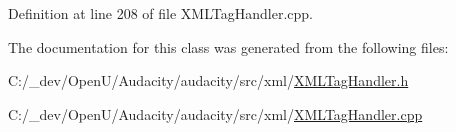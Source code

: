 Definition at line 208 of file X\+M\+L\+Tag\+Handler.\+cpp.



The documentation for this class was generated from the following files\+:\begin{DoxyCompactItemize}
\item 
C\+:/\+\_\+dev/\+Open\+U/\+Audacity/audacity/src/xml/\hyperlink{_x_m_l_tag_handler_8h}{X\+M\+L\+Tag\+Handler.\+h}\item 
C\+:/\+\_\+dev/\+Open\+U/\+Audacity/audacity/src/xml/\hyperlink{_x_m_l_tag_handler_8cpp}{X\+M\+L\+Tag\+Handler.\+cpp}\end{DoxyCompactItemize}
